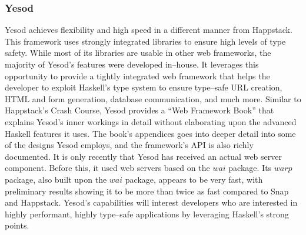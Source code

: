 \subsubsection{Yesod}
Yesod achieves flexibility and high speed in a different manner from Happstack.
This framework uses strongly integrated libraries to ensure high levels of type safety.
While most of its libraries are usable in other web frameworks, the majority of Yesod's features were developed in--house.
It leverages this opportunity to provide a tightly integrated web framework that helps the developer to exploit Haskell's type system to ensure type--safe URL creation, HTML and form generation, database communication, and much more.
Similar to Happstack's Crash Course, Yesod provides a ``Web Framework Book'' \cite{YesodBook} that explains Yesod's inner workings in detail without elaborating upon the advanced Haskell features it uses.
The book's appendices goes into deeper detail into some of the designs Yesod employs, and the framework's API is also richly documented.
It is only recently that Yesod has received an actual web server component.
Before this, it used web servers based on the $ wai $ package.
Its $ warp $ package, also built upon the $ wai $ package, appears to be very fast, with preliminary results showing it to be more than twice as fast compared to Snap and Happstack. \cite{warp}
Yesod's capabilities will interest developers who are interested in highly performant, highly type--safe applications by leveraging Haskell's strong points.